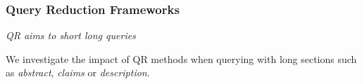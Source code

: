\documentclass[xcolor=x11names,compress]{beamer}
\renewcommand{\(}{\begin{columns}}
\renewcommand{\)}{\end{columns}}
\newcommand{\<}[1]{\begin{column}{#1}}
\renewcommand{\>}{\end{column}}
\begin{document}
\begin{frame}
\frametitle{Query Reduction Frameworks}

{\color{DeepSkyBlue4}\textit{QR aims to short long queries}}

\vspace{0.3cm}
We investigate the impact of QR methods when 
querying with long sections such as \textit{abstract}, \textit{claims} or \textit{description}.



\begin{tiny}
\begin{table}
\begin{centering}
\par\end{centering}

\begin{centering}
{\footnotesize{}}
\par\end{centering}{\footnotesize \par}


\end{table}
\end{tiny}
\end{frame}
\end{document}
